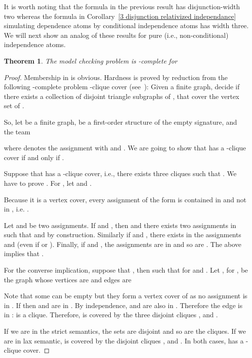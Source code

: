\documentclass{article}
\theoremstyle{plain}
\newtheorem{theorem}{Theorem}
\theoremstyle{definition}
\begin{document}
It is worth noting that the formula in the previous result has disjunction-width two whereas the formula in Corollary~\ref{3 disjunction relativized independance} simulating dependence atoms by conditional independence atoms has width three. We will next show  an analog of these results for  pure (i.e., non-conditional) independence atoms. 

\begin{theorem}\label{pure3-disjunction}
	The model checking problem 	is -complete for  
	
\end{theorem}


\begin{proof} Membership in  is obvious. Hardness is proved by reduction from the following -complete problem -clique cover (see~\cite{GareyJ1979}): Given  a finite graph, decide if there exists a collection of disjoint triangle subgraphs of , that cover the vertex set  of .

	So, let  be a finite graph,  be a first-order structure of the empty signature, and  the team
	 
	  where   denotes the assignment  with  and  .
		 We are going to show that  has a -clique cover if and only if .
	 
	 
	


Suppose that  has a -clique cover, i.e., there exists  three cliques such that . We have to prove  . For , let  and .
	 
	 Because it is a vertex cover, every assignment of the form  is contained in  and not in , i.e. .
	 
	 Let  and  be two assignments. If  and , then  and there exists two assignments   in  such that  and  by construction. Similarly if  and , there exists in  the assignments  and  (even if  or ). Finally, if  and , the assignments  are in  and so are . The above implies that .
	 
For the converse implication,   suppose that , then  such that  for  and .
	Let ,  for ,  be the graph whose vertices are  and  edges are 
	 
	 Note that some  can be empty but they form a vertex cover of  as no assignment  is in . If  then  and  are in . By independence,  and  are also in . Therefore the edge  is in :  is a clique. Therefore,  is covered by the three disjoint cliques ,  and . 
	
		If we are in the strict semantics, the sets  are disjoint and  so are the cliques. If we are in lax semantic,  is covered by the disjoint cliques ,  and . In both cases,  has a -clique cover.


\end{proof}
\end{document}
